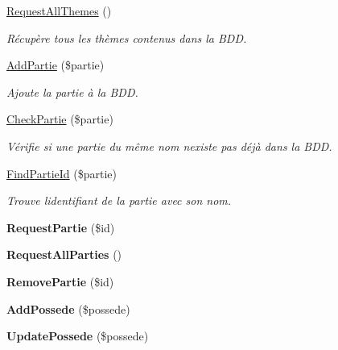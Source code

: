 \begin{DoxyCompactItemize}
\mbox{\hyperlink{class_interface_b_d_d_aaadfadb8a0a987f3d7a82dc3207e80f6}{Request\+All\+Themes}} ()
\begin{DoxyCompactList}\small\item\em Récupère tous les thèmes contenus dans la B\+DD. \end{DoxyCompactList}\item 
\mbox{\hyperlink{class_interface_b_d_d_a0bbed9af515a32afda28ca2f057d02fc}{Add\+Partie}} (\$partie)
\begin{DoxyCompactList}\small\item\em Ajoute la partie à la B\+DD. \end{DoxyCompactList}\item 
\mbox{\hyperlink{class_interface_b_d_d_a21421b30114a0f7de6e160c048c9506d}{Check\+Partie}} (\$partie)
\begin{DoxyCompactList}\small\item\em Vérifie si une partie du même nom n\textquotesingle{}existe pas déjà dans la B\+DD. \end{DoxyCompactList}\item 
\mbox{\hyperlink{class_interface_b_d_d_af667f486ba3dd4422cf48bad871f56e8}{Find\+Partie\+Id}} (\$partie)
\begin{DoxyCompactList}\small\item\em Trouve l\textquotesingle{}identifiant de la partie avec son nom. \end{DoxyCompactList}\item 
\mbox{\label{class_interface_b_d_d_a08dccbb831fa8c610a5d96158a4f38cb}} 
{\bfseries Request\+Partie} (\$id)
\item 
\mbox{\label{class_interface_b_d_d_aa51770e0fe58671f8be78be72ab88973}} 
{\bfseries Request\+All\+Parties} ()
\item 
\mbox{\label{class_interface_b_d_d_a3981553b34d86dc1419002f9a9121fc6}} 
{\bfseries Remove\+Partie} (\$id)
\item 
\mbox{\label{class_interface_b_d_d_a4247c06c17b9c86dbc80321220969862}} 
{\bfseries Add\+Possede} (\$possede)
\item 
\mbox{\label{class_interface_b_d_d_adff6bf7ab712728f7898296d73bbd71b}} 
{\bfseries Update\+Possede} (\$possede)

\end{DoxyCompactItemize}

